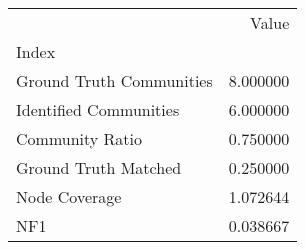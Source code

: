 \begin{tabular}{lr}
\toprule
{} &     Value \\
Index                    &           \\
\midrule
Ground Truth Communities &  8.000000 \\
Identified Communities   &  6.000000 \\
Community Ratio          &  0.750000 \\
Ground Truth Matched     &  0.250000 \\
Node Coverage            &  1.072644 \\
NF1                      &  0.038667 \\
\bottomrule
\end{tabular}
